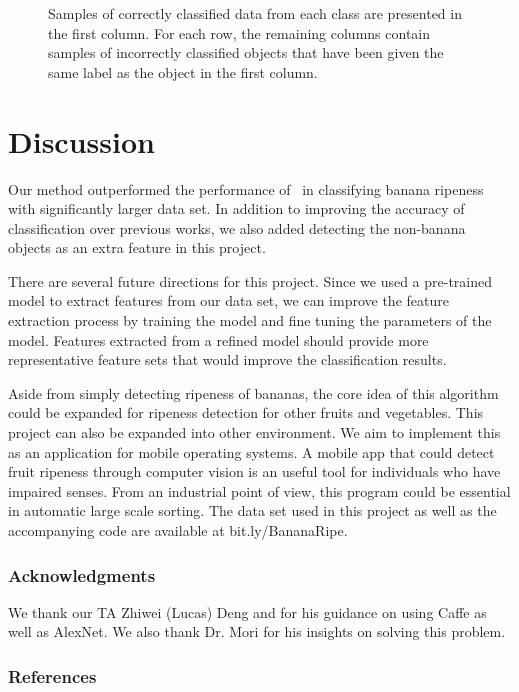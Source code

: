 \documentclass{article} %
\begin{document}
\begin{figure}[h]
\begin{subfigure}{.123\textwidth}
\captionsetup{labelformat=empty}
\caption{}
\end{subfigure}
\caption{Samples of correctly classified data from each class are presented in the first column. For each row, the remaining columns contain samples of incorrectly classified objects that have been given the same label as the object in the first column. }
\label{fig:correctVsIncorrect}
\end{figure}
\section{Discussion}
\label{sec:conclusion}

Our method outperformed  the performance of~\citet{saad2009recognizing} in classifying banana ripeness with significantly larger data set. In addition to improving the accuracy of classification over previous works, we also added detecting the non-banana objects as an extra feature in this project. 

There are several future directions for this project. Since we used a pre-trained model to extract features from our data set, we can improve the feature extraction process by training the model and fine tuning the parameters of the model. Features extracted from a refined model should provide more representative feature sets that would improve the classification results. 

Aside from simply detecting ripeness of bananas, the core idea of this algorithm could be expanded for ripeness detection for other fruits and vegetables. This project can also be expanded into other environment. We aim to implement this as an application for mobile operating systems. A mobile app that could detect fruit ripeness through computer vision is an useful tool for individuals who have impaired senses. From an industrial point of view, this program could be essential in automatic large scale sorting. The data set used in this project as well as the accompanying code are available at bit.ly/BananaRipe.

\subsubsection*{Acknowledgments}
We thank our TA Zhiwei (Lucas) Deng and for his guidance on using Caffe as well as AlexNet. We also thank Dr. Mori for his insights on solving this problem. 
 
\renewcommand\refname{\vskip -.75cm}
\subsubsection*{References}

   		    
   
\end{document}
